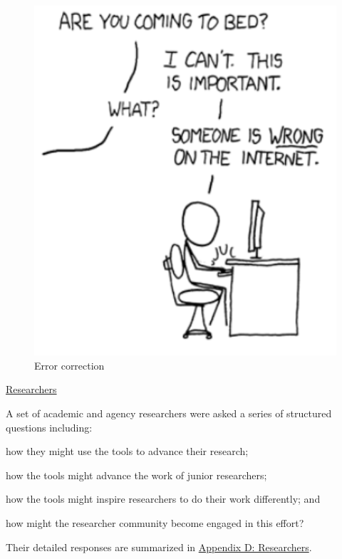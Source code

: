 \documentclass[titlepage, 11pt]{article}
\begin{document}
{%
\begin{figure}[t]
\centering
  \includegraphics[scale=0.50]{error.png}
  \caption{Error correction}
  \label{fig:error}
\end{figure}


\href{https://coleridgeinitiative.org/show-us-the-data/stakeholder-questions/#researchers}{Researchers}


A set of academic and agency researchers were asked a series of structured questions including: \begin{enumerate*}[label=(\arabic*)]
    \item how they might use the tools to advance their research; 
    \item how the tools might advance the work of junior researchers;
    \item how the tools might inspire researchers to do their work differently; and
    \item how might the researcher community become engaged in this effort? 
\end{enumerate*} Their detailed responses are summarized in \hyperref[subsec:AcademicResearchers]{Appendix D: Researchers}.

}
\end{document}
